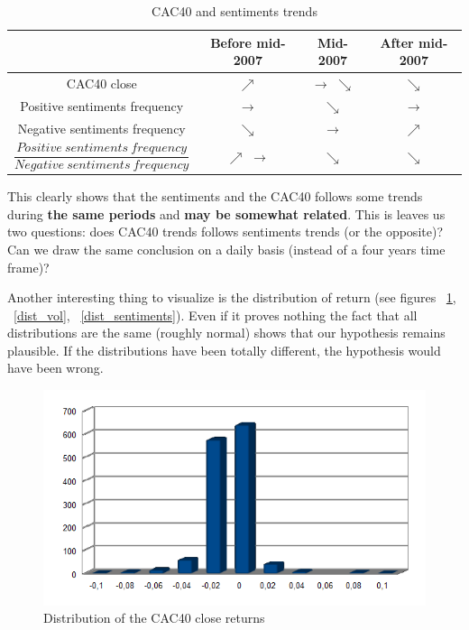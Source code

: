 \documentclass[12pt]{report}
\begin{document}
			\begin{center}
			\begin{table}
			\begin{tabular}{|c | c | c | c|}
				\hline
				& Before mid-2007 & Mid-2007 & After mid-2007\\
				\hline
				CAC40 close & $\nearrow$ & $\rightarrow$ $\searrow$ & $\searrow$\\
				\hline
				Positive sentiments frequency & $\rightarrow$ & $\searrow$ & $\rightarrow$\\
				\hline
				Negative sentiments frequency & $\searrow$ & $\rightarrow$ & $\nearrow$\\
				\hline
				$\dfrac{Positive\ sentiments\ frequency}{Negative\ sentiments\ frequency}$ & $\nearrow$ $\rightarrow$ & $\searrow$ & $\searrow$\\
				\hline
			\end{tabular}
			\caption{CAC40 and sentiments trends\label{trends}}
			\end{table}
			\end{center}
			
			This clearly shows that the sentiments and the CAC40 follows some trends during \textbf{the same periods} and \textbf{may be somewhat related}. This is leaves us two questions: does CAC40 trends follows sentiments trends (or the opposite)? Can we draw the same conclusion on a daily basis (instead of a four years time frame)?
			
			Another interesting thing to visualize is the distribution of return (see figures ~\ref{dist_cac}, ~\ref{dist_vol}, ~\ref{dist_sentiments}). Even if it proves nothing the fact that all distributions are the same (roughly normal) shows that our hypothesis remains plausible. If the distributions have been totally different, the hypothesis would have been wrong.

			\begin{figure}[H]
				\caption{Distribution of the CAC40 close returns\label{dist_cac}}
				\includegraphics{plots/dists/close_return.png}
			\end{figure}
\end{document}
